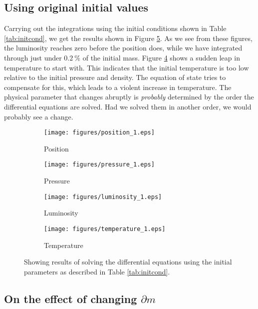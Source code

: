 \documentclass[a4paper, 11pt, english]{article}
\newcommand{\refig}[1]{\textcolor{blue}{\ref{fig:#1}}} %
\newcommand{\reftab}[1]{\textcolor{blue}{\ref{tab:#1}}} %
\begin{document}
\subsection{Using original initial values}
Carrying out the integrations using the initial conditions shown in Table
\reftab{initcond}, we get the results shown in Figure \refig{init_results}. As we see from
these figures, the luminosity reaches zero before the position does, while we have
integrated through
just under $0.2 \ \%$ of the initial mass. Figure \refig{temperature_1} shows
a sudden leap in temperature to start with. This indicates that the initial temperature is
too low relative to the initial pressure and density. The equation of state tries to
compensate for this, which leads to a violent increase in temperature. The physical
parameter that changes abruptly is \emph{probably} determined by the order the differential
equations are solved. Had we solved them in another order, we would probably see a change.
\begin{figure}[htpb]
	\begin{subfigure}{0.49\textwidth}
		\texttt{[image: figures/position\_1.eps]}
		\caption{Position}
		\label{fig:position_1}
	\end{subfigure}\hfill
	\begin{subfigure}{0.49\textwidth}
		\texttt{[image: figures/pressure\_1.eps]}
		\caption{Pressure}
		\label{fig:pressure_1}
	\end{subfigure}\hfill
	\vspace{0.35cm}
	\begin{subfigure}{0.49\textwidth}
		\texttt{[image: figures/luminosity\_1.eps]}
		\caption{Luminosity}
		\label{fig:luminosity_1}
	\end{subfigure}\hfill
	\begin{subfigure}{0.49\textwidth}
		\texttt{[image: figures/temperature\_1.eps]}
		\caption{Temperature}
		\label{fig:temperature_1}
	\end{subfigure}
	\vspace{0.2cm}
	\caption{Showing results of solving the differential equations using the initial
		parameters as described in Table \reftab{initcond}.}
	\label{fig:init_results}
\end{figure}
%

\subsection{On the effect of changing $\partial m$}
\end{document}
